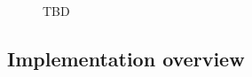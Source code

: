 
\begin{figure}[t]
\caption{TBD}
\label{fig:essay-transl}
\end{figure}


\subsection{Implementation overview}
\label{sec:impl-essay-tech}

